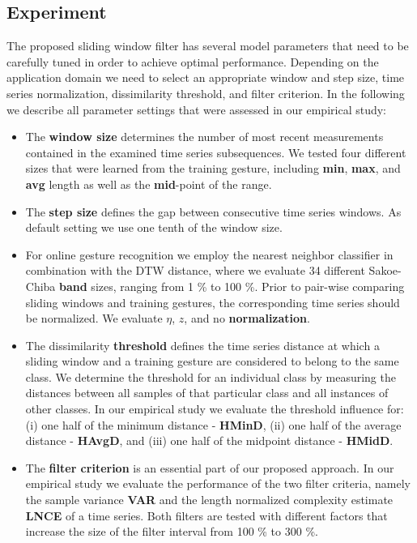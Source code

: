 \subsection{Experiment} \label{experiment}

The proposed sliding window filter has several model parameters that need to be carefully tuned in order to achieve optimal performance. Depending on the application domain we need to select an appropriate window and step size, time series normalization, dissimilarity threshold, and filter criterion. In the following we describe all parameter settings that were assessed in our empirical study:

\begin{itemize}

\item
The \textbf{window size} determines the number of most recent measurements contained in the examined time series subsequences. We tested four different sizes that were learned from the training gesture, including \textbf{min}, \textbf{max}, and \textbf{avg} length as well as the \textbf{mid}-point of the range. \\

\item
The \textbf{step size} defines the gap between consecutive time series windows. As default setting we use one tenth of the window size. \\

\item
For online gesture recognition we employ the nearest neighbor classifier in combination with the DTW distance, where we evaluate 34 different Sakoe-Chiba \textbf{band} sizes, ranging from 1 \% to 100 \%.
Prior to pair-wise comparing sliding windows and training gestures, the corresponding time series should be normalized. We evaluate $\eta$, $z$, and no \textbf{normalization}. \\

\item
The dissimilarity \textbf{threshold} defines the time series distance at which a sliding window and a training gesture are considered to belong to the same class. We determine the threshold for an individual class by measuring the distances between all samples of that particular class and all instances of other classes. In our empirical study we evaluate the threshold influence for: (i) one half of the minimum distance - \textbf{HMinD}, (ii) one half of the average distance - \textbf{HAvgD}, and (iii) one half of the midpoint distance - \textbf{HMidD}. \\

\item
The \textbf{filter criterion} is an essential part of our proposed approach. In our empirical study we evaluate the performance of the two filter criteria, namely the sample variance \textbf{VAR} and the length normalized complexity estimate \textbf{LNCE} of a time series. Both filters are tested with different factors that increase the size of the filter interval from 100 \% to 300 \%.

\end{itemize}

